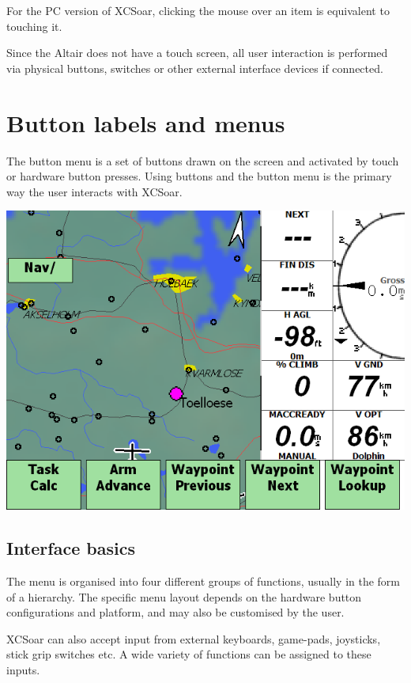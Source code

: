 \documentclass[a4paper,12pt]{refrep}
\begin{document}
For the PC version of XCSoar, clicking the mouse over an item is equivalent to
touching it.

Since the Altair does not have a touch screen, all user interaction is performed
via physical buttons, switches or other external interface devices if connected.

\section{Button labels and menus}
The button menu is a set of buttons drawn on the screen and activated by touch
or hardware button presses.  Using buttons and the button menu is the primary
way the user interacts with XCSoar.

\begin{center}
\includegraphics[angle=0,width=\linewidth,keepaspectratio='true']{figures/buttonmenu.png}
\end{center}

\subsection*{Interface basics}
The menu is organised into four different groups of functions, usually in
the form of a hierarchy.  The specific menu layout depends on the
hardware button configurations and platform, and may also be customised by the
user.

XCSoar can also accept input from external keyboards, game-pads, joysticks,
stick grip switches etc. A wide variety of functions can be assigned to these
inputs.
\end{document}
